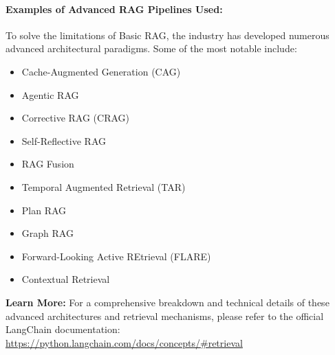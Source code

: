 \paragraph{Examples of Advanced RAG Pipelines Used:}
To solve the limitations of Basic RAG, the industry has developed numerous advanced architectural paradigms. Some of the most notable include:

\begin{itemize}
    \item Cache-Augmented Generation (CAG)
    \item Agentic RAG
    \item Corrective RAG (CRAG)
    \item Self-Reflective RAG
    \item RAG Fusion
    \item Temporal Augmented Retrieval (TAR)
    \item Plan RAG
    \item Graph RAG
    \item Forward-Looking Active REtrieval (FLARE)
    \item Contextual Retrieval
\end{itemize}

\vspace{0.3cm}
\noindent \textbf{Learn More:} For a comprehensive breakdown and technical details of these advanced architectures and retrieval mechanisms, please refer to the official LangChain documentation: \\
\url{https://python.langchain.com/docs/concepts/#retrieval}